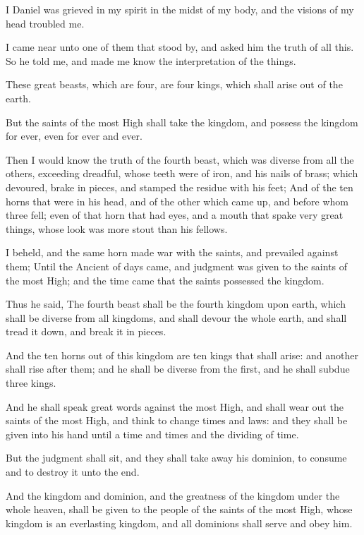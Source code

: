 \verse I Daniel was grieved in my spirit in the midst of my body, and the visions of my head troubled me.

\verse I came near unto one of them that stood by, and asked him the truth of all this. So he told me, and made me know the interpretation of the things.

\verse These great beasts, which are four, are four kings, which shall arise out of the earth.

\verse But the saints of the most High shall take the kingdom, and possess the kingdom for ever, even for ever and ever.

\verse Then I would know the truth of the fourth beast, which was diverse from all the others, exceeding dreadful, whose teeth were of iron, and his nails of brass; which devoured, brake in pieces, and stamped the residue with his feet; \verse And of the ten horns that were in his head, and of the other which came up, and before whom three fell; even of that horn that had eyes, and a mouth that spake very great things, whose look was more stout than his fellows.

\verse I beheld, and the same horn made war with the saints, and prevailed against them; \verse Until the Ancient of days came, and judgment was given to the saints of the most High; and the time came that the saints possessed the kingdom.

\verse Thus he said, The fourth beast shall be the fourth kingdom upon earth, which shall be diverse from all kingdoms, and shall devour the whole earth, and shall tread it down, and break it in pieces.

\verse And the ten horns out of this kingdom are ten kings that shall arise: and another shall rise after them; and he shall be diverse from the first, and he shall subdue three kings.

\verse And he shall speak great words against the most High, and shall wear out the saints of the most High, and think to change times and laws: and they shall be given into his hand until a time and times and the dividing of time.

\verse But the judgment shall sit, and they shall take away his dominion, to consume and to destroy it unto the end.

\verse And the kingdom and dominion, and the greatness of the kingdom under the whole heaven, shall be given to the people of the saints of the most High, whose kingdom is an everlasting kingdom, and all dominions shall serve and obey him.

